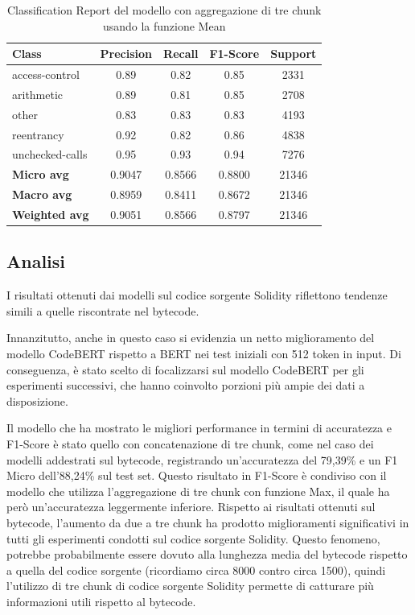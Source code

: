 \documentclass[../../Thesis.tex]{subfiles}
\begin{document}
\begin{table}[H]
    \centering
    \small
    \begin{tabular}{lcccc}
    \hline
    \textbf{Class} & \textbf{Precision} & \textbf{Recall} & \textbf{F1-Score} & \textbf{Support} \\
    \hline
    access-control & 0.89 & 0.82 & 0.85 & 2331 \\
    arithmetic & 0.89 & 0.81 & 0.85 & 2708 \\
    other & 0.83 & 0.83 & 0.83 & 4193 \\
    reentrancy & 0.92 & 0.82 & 0.86 & 4838 \\
    unchecked-calls & 0.95 & 0.93 & 0.94 & 7276 \\
    \hline
    \textbf{Micro avg} & 0.9047 & 0.8566 & 0.8800 & 21346 \\
    \textbf{Macro avg} & 0.8959 & 0.8411 & 0.8672 & 21346 \\
    \textbf{Weighted avg} & 0.9051 & 0.8566 & 0.8797 & 21346 \\
    \hline
    \end{tabular}
    \caption{Classification Report del modello con aggregazione di tre chunk usando la funzione Mean}
    \end{table}
\subsection{Analisi}
I risultati ottenuti dai modelli  sul codice sorgente Solidity riflettono tendenze simili a quelle riscontrate nel bytecode.

Innanzitutto, anche in questo caso si evidenzia un netto miglioramento del modello CodeBERT rispetto a BERT nei test iniziali con 512 token in input. Di conseguenza, \`e stato scelto di focalizzarsi sul modello CodeBERT per gli esperimenti successivi, che hanno coinvolto porzioni pi\`u ampie dei dati a disposizione.

Il modello che ha mostrato le migliori performance in termini di accuratezza e F1-Score \`e stato quello con concatenazione di tre chunk, come nel caso dei modelli addestrati sul bytecode, registrando un'accuratezza del 79,39\% e un F1 Micro dell'88,24\% sul test set. Questo risultato in F1-Score \`e condiviso con il modello che utilizza l'aggregazione di tre chunk con funzione Max, il quale ha per\`o un'accuratezza leggermente inferiore. Rispetto ai risultati ottenuti sul bytecode, l'aumento da due a tre chunk ha prodotto miglioramenti significativi in tutti gli esperimenti condotti sul codice sorgente Solidity. Questo fenomeno, potrebbe probabilmente essere dovuto alla lunghezza media del bytecode rispetto a quella del codice sorgente (ricordiamo circa 8000 contro circa 1500), quindi l'utilizzo di tre chunk di codice sorgente Solidity permette di catturare pi\`u informazioni utili rispetto al bytecode.
\end{document}
